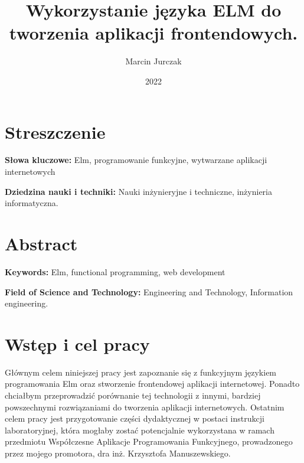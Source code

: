 \documentclass[twoside,a4paper]{report}
\begin{document}


\title{Wykorzystanie języka ELM do tworzenia aplikacji frontendowych.}
\author{Marcin Jurczak}
\date{2022}

\maketitle


\chapter*{Streszczenie}
\lipsum[1]

\textbf{Słowa kluczowe:} Elm, programowanie funkcyjne, wytwarzane aplikacji internetowych

\textbf{Dziedzina nauki i techniki: }Nauki inżynieryjne i techniczne, inżynieria informatyczna.

{\let\clearpage\relax\chapter*{Abstract}}
\lipsum[1]

\textbf{Keywords:} Elm, functional programming, web development

\textbf{Field of Science and Technology:} Engineering and Technology, Information engineering.

\tableofcontents


\chapter{Wstęp i cel pracy}
Głównym celem niniejszej pracy jest zapoznanie się z funkcyjnym językiem programowania Elm oraz stworzenie frontendowej aplikacji internetowej. Ponadto chciałbym przeprowadzić porównanie tej technologii z innymi, bardziej powszechnymi rozwiązaniami do tworzenia aplikacji internetowych. Ostatnim celem pracy jest przygotowanie części dydaktycznej w postaci instrukcji laboratoryjnej, która mogłaby zostać potencjalnie wykorzystana w ramach przedmiotu Współczesne Aplikacje Programowania Funkcyjnego, prowadzonego przez mojego promotora, dra inż. Krzysztofa Manuszewskiego.
\end{document}

